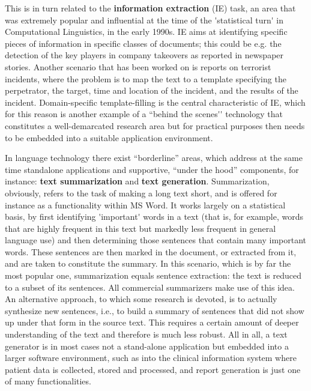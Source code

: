 \documentclass[]{../metanetpaper}
\begin{document}
\begin{multicols}{2}
This is in turn related to the {\bf information extraction} (IE) task, an
area that was extremely popular and influential at the time of the
{\mbox '}statistical turn{\mbox '} in Computational Linguistics, in the early
1990s. IE aims at identifying specific pieces of information in
specific classes of documents; this could be e.g. the detection of the
key players in company takeovers as reported in newspaper
stories. Another scenario that has been worked on is reports on
terrorist incidents, where the problem is to map the text to a
template specifying the perpetrator, the target, time and location of
the incident, and the results of the incident. Domain-specific
template-filling is the central characteristic of IE, which for this
reason is another example of a ``behind the scenes{\mbox '}{\mbox '} technology that
constitutes a well-demarcated research area but for practical purposes
then needs to be embedded into a suitable application environment.

In language technology there exist ``borderline'' areas, which address at the same time standalone applications and supportive, ``under the hood''
components, for instance: {\bf text summarization} and {\bf text
  generation}. Summarization, obviously, refers to the task of making
a long text short, and is offered for instance as a functionality
within MS Word. It works largely on a statistical basis, by first
identifying {\mbox '}important{\mbox '} words in a text (that is, for example, words
that are highly frequent in this text but markedly less frequent in
general language use) and then determining those sentences that
contain many important words. These sentences are then marked in the
document, or extracted from it, and are taken to constitute the
summary. In this scenario, which is by far the most popular one,
summarization equals sentence extraction: the text is reduced to a
subset of its sentences. All commercial summarizers make use of this
idea. An alternative approach, to which some research is devoted, is
to actually synthesize new sentences, i.e., to build a summary of
sentences that did not show up under that form in the source text. This
requires a certain amount of deeper understanding of the text and
therefore is much less robust. All in all, a text generator is in most
cases not a stand-alone application but embedded into a larger
software environment, such as into the clinical information system
where patient data is collected, stored and processed, and report
generation is just one of many functionalities.


\end{multicols}
\end{document}
